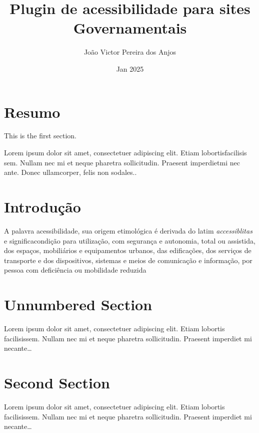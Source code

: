 \documentclass[12pt,letterpaper]{article}
\title{Plugin de acessibilidade para sites Governamentais}
\author{João Victor Pereira dos Anjos}
\date{Jan 2025}
\begin{document}
\maketitle
  
\tableofcontents

\section{Resumo}
   
This is the first section.
      
Lorem  ipsum  dolor  sit  amet,  consectetuer  adipiscing  
elit.   Etiam  lobortisfacilisis sem.  Nullam nec mi et 
neque pharetra sollicitudin.  Praesent imperdietmi nec ante. 
Donec ullamcorper, felis non sodales..

\section{Introdução}

A palavra acessibilidade, sua origem etimológica é derivada do latim \textit{accessiblitas} e significacondição para utilização, com segurança e autonomia, total ou assistida, dos espaços, mobiliários e equipamentos urbanos, das edificações, dos serviços de transporte e dos dispositivos, sistemas e meios de comunicação e informação, por pessoa com deficiência ou mobilidade reduzida
       
\section*{Unnumbered Section}

Lorem ipsum dolor sit amet, consectetuer adipiscing elit.  
Etiam lobortis facilisissem.  Nullam nec mi et neque pharetra 
sollicitudin.  Praesent imperdiet mi necante\ldots

\section{Second Section}
       
Lorem ipsum dolor sit amet, consectetuer adipiscing elit.  
Etiam lobortis facilisissem.  Nullam nec mi et neque pharetra 
sollicitudin.  Praesent imperdiet mi necante\ldots

\medskip

\printbibliography
\end{document}
